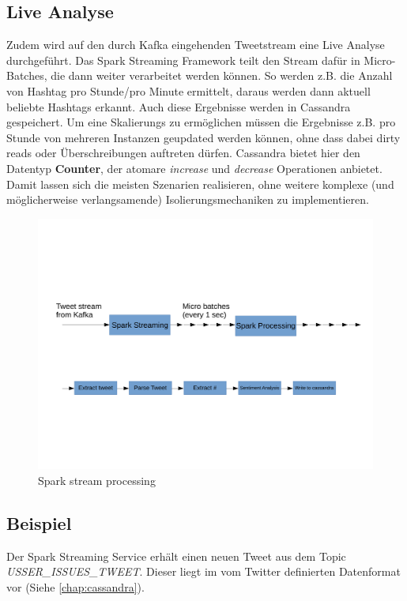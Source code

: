\subsection*{Live Analyse}
Zudem wird auf den durch Kafka eingehenden Tweetstream eine Live Analyse durchgeführt.
Das Spark Streaming Framework teilt den Stream dafür in Micro-Batches, die dann weiter verarbeitet werden können.
So werden z.B. die Anzahl von Hashtag pro Stunde/pro Minute ermittelt, daraus werden dann aktuell beliebte Hashtags erkannt.
Auch diese Ergebnisse werden in Cassandra gespeichert.
Um eine Skalierungs zu ermöglichen müssen die Ergebnisse z.B. pro Stunde von mehreren Instanzen geupdated werden können, ohne dass dabei dirty reads oder Überschreibungen auftreten dürfen. Cassandra bietet hier den Datentyp \textbf{Counter}, der atomare \textit{increase} und \textit{decrease} Operationen anbietet. Damit lassen sich die meisten Szenarien realisieren, ohne weitere  komplexe (und möglicherweise verlangsamende) Isolierungsmechaniken zu implementieren.
\begin{figure}[htbp!]
\centering
\includegraphics[width=\linewidth]{pics/analytics/streamProcessing.pdf}
\caption{Spark stream processing}
\label{fig:streamProcessing}
\end{figure}

\subsection*{Beispiel}

Der Spark Streaming Service erhält einen neuen Tweet aus dem Topic \textit{USSER\_ISSUES\_TWEET}.
Dieser liegt im vom Twitter definierten Datenformat vor (Siehe \ref{chap:cassandra}).

